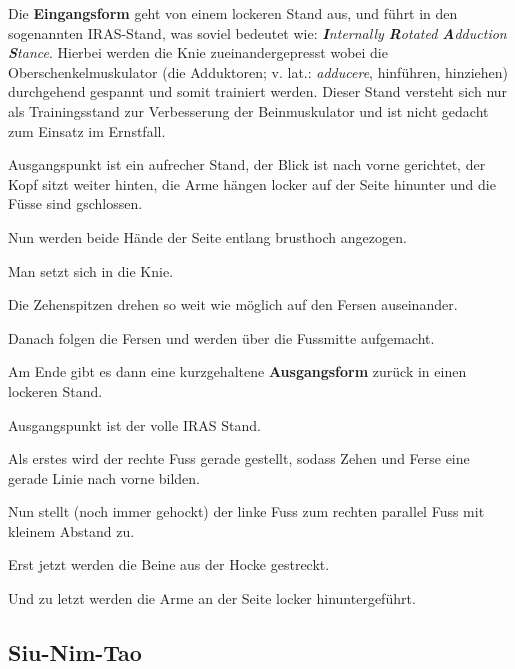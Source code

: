 Die \textbf{Eingangsform} geht von einem lockeren Stand aus, und f\"uhrt in den sogenannten IRAS-Stand, was soviel bedeutet wie: \textit{\textbf{I}nternally \textbf{R}otated \textbf{A}dduction \textbf{S}tance}. Hierbei werden die Knie zueinandergepresst wobei die Oberschenkelmuskulator (die Adduktoren; v. lat.: \textit{adducere}, hinf\"uhren, hinziehen) durchgehend gespannt und somit trainiert werden. Dieser Stand versteht sich nur als Trainingsstand zur Verbesserung der Beinmuskulator und ist nicht gedacht zum Einsatz im Ernstfall.

\begin{WTalphenum}
	\item Ausgangspunkt ist ein aufrecher Stand, der Blick ist nach vorne gerichtet, der Kopf sitzt weiter hinten, die Arme h\"angen locker auf der Seite hinunter und die F\"usse sind gschlossen.
	\item Nun werden beide H\"ande der Seite entlang brusthoch angezogen.
	\item Man setzt sich in die Knie.
	\item Die Zehenspitzen drehen so weit wie m\"oglich auf den Fersen auseinander.
	\item Danach folgen die Fersen und werden \"uber die Fussmitte aufgemacht.
\end{WTalphenum}



Am Ende gibt es dann eine kurzgehaltene \textbf{Ausgangsform} zur\"uck in einen lockeren Stand.

\begin{WTalphenum}
	\item Ausgangspunkt ist der volle IRAS Stand.
	\item Als erstes wird der rechte Fuss gerade gestellt, sodass Zehen und Ferse eine gerade Linie nach vorne bilden.
	\item Nun stellt (noch immer gehockt) der linke Fuss zum rechten parallel Fuss mit kleinem Abstand zu.
	\item Erst jetzt werden die Beine aus der Hocke gestreckt.
	\item Und zu letzt werden die Arme an der Seite locker hinuntergef\"uhrt.
\end{WTalphenum}


\subsection{Siu-Nim-Tao}

